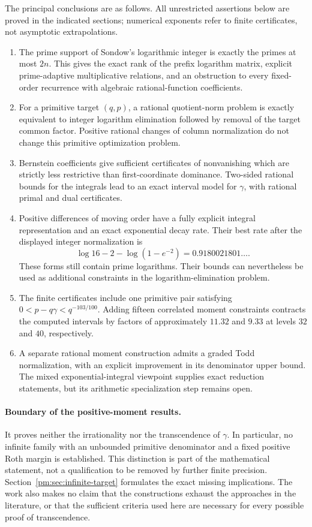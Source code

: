 \documentclass[11pt,a4paper]{article}
\theoremstyle{definition}
\theoremstyle{remark}
\numberwithin{equation}{section}
\begin{document}
The principal conclusions are as follows.  All unrestricted assertions below
are proved in the indicated sections; numerical exponents refer to finite
certificates, not asymptotic extrapolations.
\begin{enumerate}[leftmargin=*,itemsep=3pt]
\item The prime support of Sondow's logarithmic integer is exactly the primes
at most $2n$.  This gives the exact rank of the prefix logarithm matrix,
explicit prime-adaptive multiplicative relations, and an obstruction to
every fixed-order recurrence with algebraic rational-function coefficients.
\item For a primitive target $(q,p)$, a rational quotient-norm problem is
exactly equivalent to integer logarithm elimination followed by removal of
the target common factor.  Positive rational changes of column normalization
do not change this primitive optimization problem.
\item Bernstein coefficients give sufficient certificates of nonvanishing
which are strictly less restrictive than first-coordinate dominance.
Two-sided rational bounds for the integrals lead to an exact interval model
for $\gamma$, with rational primal and dual certificates.
\item Positive differences of moving order have a fully explicit integral
representation and an exact exponential decay rate.  Their best rate after
the displayed integer normalization is
\[
 \log16-2-\log(1-e^{-2})=0.9180021801\ldots.
\]
These forms still contain prime logarithms.  Their bounds can nevertheless
be used as additional constraints in the logarithm-elimination problem.
\item The finite certificates include one primitive pair satisfying
$0<p-q\gamma<q^{-103/100}$.  Adding fifteen correlated moment constraints
contracts the computed intervals by factors of approximately $11.32$ and
$9.33$ at levels $32$ and $40$, respectively.
\item A separate rational moment construction admits a graded Todd
normalization, with an explicit improvement in its denominator upper bound.
The mixed exponential-integral viewpoint supplies exact reduction
statements, but its arithmetic specialization step remains open.
\end{enumerate}

\paragraph{Boundary of the positive-moment results.}
It proves neither the irrationality nor the transcendence of $\gamma$.
In particular, no infinite family with an unbounded primitive denominator
and a fixed positive Roth margin is established.  This distinction is part
of the mathematical statement, not a qualification to be removed by further
finite precision.  Section~\ref{pm:sec:infinite-target} formulates the exact
missing implications.  The work also makes no claim that the constructions
exhaust the approaches in the literature, or that the sufficient criteria
used here are necessary for every possible proof of transcendence.
\end{document}
